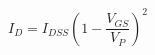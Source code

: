 \documentclass[preview]{standalone}
\begin{document}
\begin{align*}
I_D = I_{DSS} ( 1-\dfrac{V_{GS}}{V_P} )^2
\end{align*}
\end{document}
